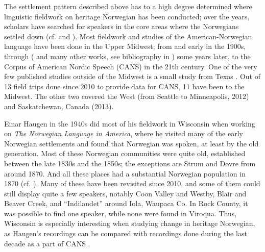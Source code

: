 \documentclass[output=paper]{langscibook}
\begin{document}
The settlement pattern described above has to a high degree determined where linguistic fieldwork on heritage Norwegian has been conducted; over the years, scholars have searched for speakers in the core areas where the Norwegians settled down (cf.  and ). Most fieldwork and studies of the American\hyp Norwegian language have been done in the Upper Midwest; from \citet{Flaten1900} and \citet{Flom1900, Flom1903, Flom1912, Flom1926, Flom1929} early in the 1900s, through \citeauthor{Haugen1953} (\citeyear{Haugen1953} and many other works, see bibliography in \citealt{FirchowEtAl1972}) some years later, to the Corpus of American Nordic Speech (CANS) \citep{Johannessen2015CANS} in the 21th century. One of the very few published studies outside of the Midwest is a small study from Texas \citep{Johansen1970}. Out of 13 field trips done since 2010 to provide data for CANS, 11 have been to the Midwest. The other two covered the West (from Seattle to Minneapolis, 2012) and Saskatchewan, Canada (2013).

Einar Haugen in the 1940s did most of his fieldwork in Wisconsin when working on \textit{The Norwegian Language in America}, where he visited many of the early Norwegian settlements and found that Norwegian was spoken, at least by the old generation. Most of these Norwegian communities were quite old, established between the late 1830s and the 1850s; the exceptions are Strum and Dovre from around 1870. And all these places had a substantial Norwegian population in 1870 (cf. ). Many of these have been revisited since 2010, and some of them could still display quite a few speakers, notably Coon Valley and Westby, Blair and Beaver Creek, and “Indilandet” around Iola, Waupaca Co. In Rock County, it was possible to find one speaker, while none were found in Viroqua. Thus, Wisconsin is especially interesting when studying change in heritage Norwegian, as Haugen’s recordings can be compared with recordings done during the last decade as a part of CANS \citep{Johannessen2015CANS}.   
\end{document}

